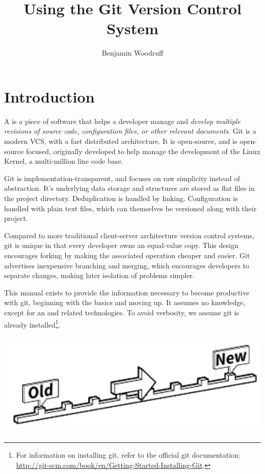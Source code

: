 \documentclass[11pt,letterpaper,twoside]{report}
\title{Using the Git Version Control System}
\author{Benjamin Woodruff}
\begin{document}
\maketitle
\maketoc

\chapter{Introduction}

A  is a piece of software that helps a
developer manage and \emph{develop multiple revisions of source
code\cite{vcs-history}, configuration files, or other relevant documents}. Git
is a modern VCS, with a fast distributed architecture. It is open-source, and is
open-source focused, originally developed to help manage the development of the
Linux Kernel\cite{linus-scalability}, a multi-million line code
base\cite{kernel-size}.

Git is implementation-transparent, and focuses on raw simplicity instead of
abstraction. It's underlying data storage and structures are stored as flat
files in the project directory. Deduplication is handled by linking.
Configuration is handled with plain text files, which can themselves be
versioned along with their project\cite{git-magic}.

Compared to more traditional client-server architecture version control systems,
git is unique in that every developer owns an equal-value copy. This design
encourages forking by making the associated operation cheaper and easier. Git
advertises inexpensive branching and merging, which encourages developers to
separate changes, making later isolation of problems
simpler\cite{dvcs-migration}.

This manual exists to provide the information necessary to become productive
with git, beginning with the basics and moving up. It assumes no knowledge,
except for an  and related technologies.
To avoid verbosity, we assume git is already installed\footnote{For information
on installing git, refer to the official git documentation:
\url{http://git-scm.com/book/en/Getting-Started-Installing-Git}.}.

\vspace{\fill}
\begin{center}
\includegraphics[height=5cm]{resources/timeline_abstract.pdf}
\end{center}
\vspace*{\fill}
\end{document}
